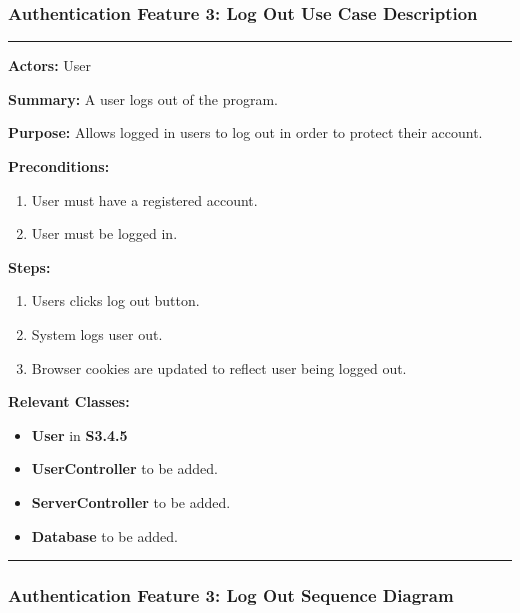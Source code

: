\documentclass[twoside,letterpaper]{article}
\begin{document}
\newpage

\subsubsection[Authentication Feature 3: Log Out Use Case Description]{\rmfamily\bfseries\color{black}
	Authentication Feature 3: Log Out Use Case Description}
\hypertarget{RefHeading22059017292}{}

\hrule
\vspace{8pt}
\noindent\textbf{Actors:} User \newline

\noindent\textbf{Summary:} A user logs out of the program.  \newline

\noindent\textbf{Purpose:} Allows logged in users to log out in order to protect their account.  \newline

\noindent\textbf{Preconditions:}
\begin{enumerate}
	\item User must have a registered account.
	\item User must be logged in.
\end{enumerate}

\noindent\textbf{Steps:}
\begin{enumerate}
	\item Users clicks log out button.
	\item System logs user out.
	\item Browser cookies are updated to reflect user being logged out.
\end{enumerate}

\noindent\textbf{Relevant Classes:}
\begin{itemize}
	\item \textbf{User} in \textbf{S3.4.5}
	\item \textbf{UserController} to be added.
	\item \textbf{ServerController} to be added.
	\item \textbf{Database} to be added.
\end{itemize}
\vspace{8pt}
\hrule
\newpage

\subsubsection[Authentication Feature 3: Log Out Sequence Diagram]{\rmfamily\bfseries\color{black}
	Authentication Feature 3: Log Out Sequence Diagram}
\hypertarget{RefHeading22059017292}{}
\end{document}
